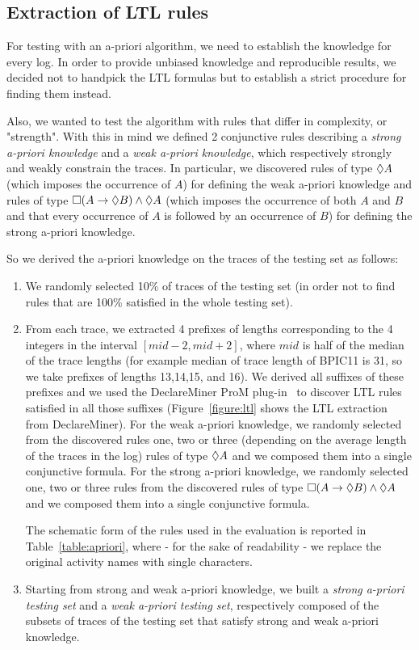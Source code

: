 \subsection{Extraction of LTL rules} \label{extractionLTLrules}

For testing with an a-priori algorithm, we need to establish the knowledge for every log. In order to provide unbiased knowledge and reproducible results, we decided not to handpick the LTL formulas but to establish a strict procedure for finding them instead.

Also, we wanted to test the algorithm with rules that differ in complexity, or "strength". With this in mind we defined 2 conjunctive rules describing a \textit{strong a-priori knowledge} and a \textit{weak a-priori knowledge}, which respectively strongly and weakly constrain the traces. In particular, we discovered rules of type $\lozenge A$ (which imposes the occurrence of $A$) for defining the weak a-priori knowledge and rules of type $\square(A \rightarrow \lozenge B) \wedge \lozenge A$ (which imposes the occurrence of both $A$ and $B$ and that every occurrence of $A$ is followed by an occurrence of $B$) for defining the strong a-priori knowledge.

So we derived the a-priori knowledge on the traces of the testing set as follows:
\begin{enumerate}
\item We randomly selected 10\% of traces of the testing set (in order not to find rules that are 100\% satisfied in the whole testing set). 
\item From each trace, we extracted 4 prefixes of lengths corresponding to the 4 integers in the interval $\left[mid-2,mid+2\right]$, where $mid$ is half of the median of the trace lengths (for example median of trace length of BPIC11 is 31, so we take prefixes of lengths 13,14,15, and 16). We derived all suffixes of these prefixes and we used the DeclareMiner ProM plug-in~\cite{Maggi2012} to discover LTL rules satisfied in all those suffixes (Figure~\ref{figure:ltl} shows the LTL extraction from DeclareMiner). 
\subitem For the weak a-priori knowledge, we randomly selected from the discovered rules one, two or three (depending on the average length of the traces in the log) rules of type $\lozenge A$ and we composed them into a single conjunctive formula. 
\subitem For the strong a-priori knowledge, we randomly selected one, two or three rules from the discovered rules of type $\square(A \rightarrow \lozenge B) \wedge \lozenge A$ and we composed them into a single conjunctive formula. 

The schematic form of the rules used in the evaluation is reported in Table~\ref{table:apriori}, where - for the sake of readability - we replace the original activity names with single characters. 

\item Starting from strong and weak a-priori knowledge, we built a \emph{strong a-priori testing set} and a \emph{weak a-priori testing set}, respectively composed of the subsets of traces of the testing set that satisfy strong and weak a-priori knowledge.

\end{enumerate}

